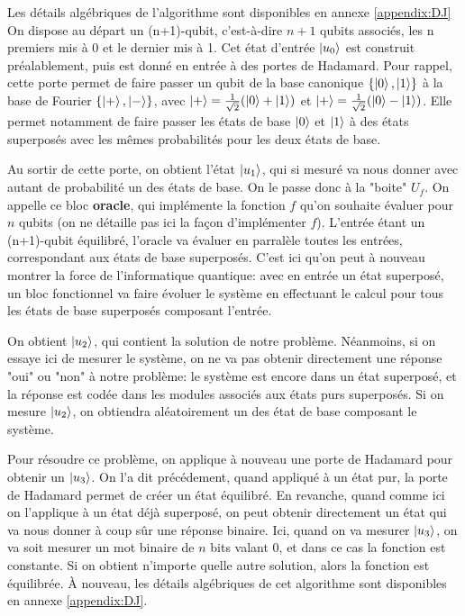 Les détails algébriques de l'algorithme sont disponibles en annexe \ref{appendix:DJ}
\medbreak
On dispose au départ un (n+1)-qubit, c'est-à-dire $n+1$ qubits associés, les n premiers mis à 0 et le dernier mis à 1. Cet état d'entrée $\ket{u_0}$ est construit préalablement, puis est donné en entrée à des portes de Hadamard. Pour rappel, cette porte permet de faire passer un qubit de la base canonique $\{\ket{0}, \ket{1}\}$ à la base de Fourier $\{\ket{+}, \ket{-}\}$, avec $\ket{+} = \frac{1}{\sqrt{2}} (\ket{0} + \ket{1})$ et $\ket{+} = \frac{1}{\sqrt{2}} (\ket{0} - \ket{1})$. Elle permet notamment de faire passer les états de base $\ket{0}$ et $\ket{1}$ à des états superposés avec les mêmes probabilités pour les deux états de base.

Au sortir de cette porte, on obtient l'état $\ket{u_1}$, qui si mesuré va nous donner avec autant de probabilité un des états de base. On le passe donc à la "boite" $U_f$. On appelle ce bloc \textbf{oracle}, qui implémente la fonction $f$ qu'on souhaite évaluer pour $n$ qubits (on ne détaille pas ici la façon d'implémenter $f$). L'entrée étant un (n+1)-qubit équilibré, l'oracle va évaluer en parralèle toutes les entrées, correspondant aux états de base superposés. C'est ici qu'on peut à nouveau montrer la force de l'informatique quantique: avec en entrée un état superposé, un bloc fonctionnel va faire évoluer le système en effectuant le calcul pour tous les états de base superposés composant l'entrée.

On obtient $\ket{u_2}$, qui contient la solution de notre problème. Néanmoins, si on essaye ici de mesurer le système, on ne va pas obtenir directement une réponse "oui" ou "non" à notre problème: le système est encore dans un état superposé, et la réponse est codée dans les modules associés aux états purs superposés. Si on mesure $\ket{u_2}$, on obtiendra aléatoirement un des état de base composant le système.

Pour résoudre ce problème, on applique à nouveau une porte de Hadamard pour obtenir un $\ket{u_3}$. On l'a dit précédement, quand appliqué à un état pur, la porte de Hadamard permet de créer un état équilibré. En revanche, quand comme ici on l'applique à un état déjà superposé, on peut obtenir directement un état qui va nous donner à coup sûr une réponse binaire. Ici, quand on va mesurer $\ket{u_3}$, on va soit mesurer un mot binaire de $n$ bits valant 0, et dans ce cas la fonction est constante. Si on obtient n'importe quelle autre solution, alors la fonction est équilibrée. \`A nouveau, les détails algébriques de cet algorithme sont disponibles en annexe \ref{appendix:DJ}.

